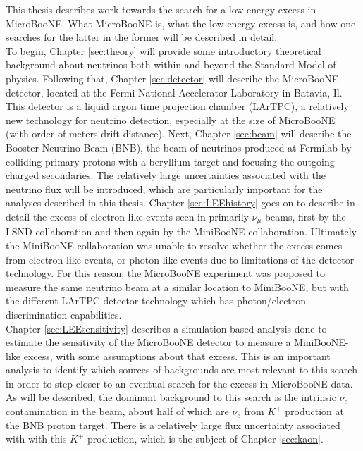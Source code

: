 This thesis describes work towards the search for a low energy excess in MicroBooNE. What MicroBooNE is, what the low energy excess is, and how one searches for the latter in the former will be described in detail.\\

To begin, Chapter \ref{sec:theory} will provide some introductory theoretical background about neutrinos both within and beyond the Standard Model of physics. Following that, Chapter \ref{sec:detector} will describe the MicroBooNE detector, located at the Fermi National Accelerator Laboratory in Batavia, Il. This detector is a liquid argon time projection chamber (LArTPC), a relatively new technology for neutrino detection, especially at the size of MicroBooNE (with order of meters drift distance). Next, Chapter \ref{sec:beam} will describe the Booster Neutrino Beam (BNB), the beam of neutrinos produced at Fermilab by colliding primary protons with a beryllium target and focusing the outgoing charged secondaries. The relatively large uncertainties associated with the neutrino flux will be introduced, which are particularly important for the analyses described in this thesis. Chapter \ref{sec:LEEhistory} goes on to describe in detail the excess of electron-like events seen in primarily $\nu_\mu$ beams, first by the LSND collaboration and then again by the MiniBooNE collaboration. Ultimately the MiniBooNE collaboration was unable to resolve whether the excess comes from electron-like events, or photon-like events due to limitations of the detector technology. For this reason, the MicroBooNE experiment was proposed to measure the same neutrino beam at a similar location to MiniBooNE, but with the different LArTPC detector technology which has photon/electron discrimination capabilities.\\

Chapter \ref{sec:LEEsensitivity} describes a simulation-based analysis done to estimate the sensitivity of the MicroBooNE detector to measure a MiniBooNE-like excess, with some assumptions about that excess. This is an important analysis to identify which sources of backgrounds are most relevant to this search in order to step closer to an eventual search for the excess in MicroBooNE data. As will be described, the dominant background to this search is the intrinsic $\nu_e$ contamination in the beam, about half of which are $\nu_e$ from $K^+$ production at the BNB proton target. There is a relatively large flux uncertainty associated with with this $K^+$ production, which is the subject of Chapter \ref{sec:kaon}.\\

